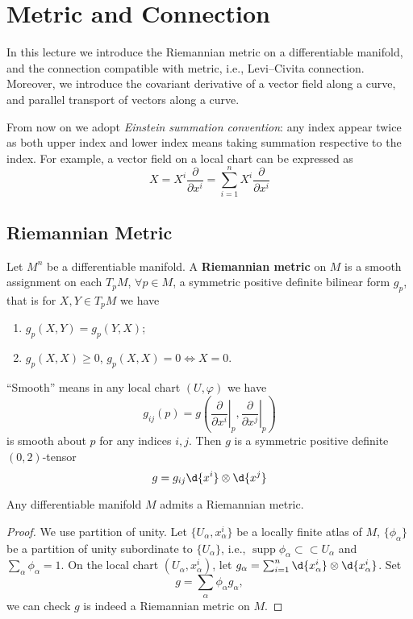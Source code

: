 \chapter{Metric and Connection}

In this lecture we introduce the Riemannian metric on a differentiable manifold, and the connection compatible with metric, i.e., Levi--Civita connection.
Moreover, we introduce the covariant derivative of a vector field along a curve, and parallel transport of vectors along a curve.

\begin{symb}
    From now on we adopt \emph{Einstein summation convention}:
    any index appear twice as both upper index and lower index means taking summation respective to the index.
    For example, a vector field on a local chart can be expressed as
    \[X=X^i\frac{\partial{}}{\partial{x^i}}=\sum_{i=1}^nX^i\frac{\partial{}}{\partial{x^i}}\]
\end{symb}

\section{Riemannian Metric}

\begin{defn}
    Let $M^n$ be a differentiable manifold.
    A \textbf{Riemannian metric} on $M$ is a smooth assignment on each $T_pM$, $\forall p\in M$, a symmetric positive definite bilinear form $g_p$, that is for $X,Y\in T_pM$ we have
    \begin{enumerate}
        \item $g_p(X,Y)=g_p(Y,X)$;
        \item $g_p(X,X)\geq 0$, $g_p(X,X)=0\iff X=0$.
    \end{enumerate}
    ``Smooth'' means in any local chart $(U,\varphi)$ we have
    \[g_{ij}(p)=g\left(\left.\frac{\partial{}}{\partial{x^i}}\right|_p,\left.\frac{\partial{}}{\partial{x^j}}\right|_p\right)\]
    is smooth about $p$ for any indices $i,j$.
    Then $g$ is a symmetric positive definite $(0,2)$-tensor
    \[g=g_{ij}\d{x^i}\otimes\d{x^j}\]
\end{defn}

\begin{prop}
    Any differentiable manifold $M$ admits a Riemannian metric.
\end{prop}
\begin{proof}
    We use partition of unity.
    Let $\{U_\alpha,x_\alpha^i\}$ be a locally finite atlas of $M$, $\{\phi_\alpha\}$ be a partition of unity subordinate to $\{U_\alpha\}$, i.e., $\operatorname{supp}\phi_\alpha\subset\subset U_\alpha$ and $\sum_\alpha\phi_\alpha=1$.
    On the local chart $(U_\alpha,x_\alpha^i)$, let $g_\alpha=\sum_{i=1}^n\d{x_\alpha^i}\otimes\d{x_\alpha^i}$.
    Set
    \[g=\sum_{\alpha}\phi_\alpha g_\alpha,\]
    we can check $g$ is indeed a Riemannian metric on $M$.
\end{proof}

